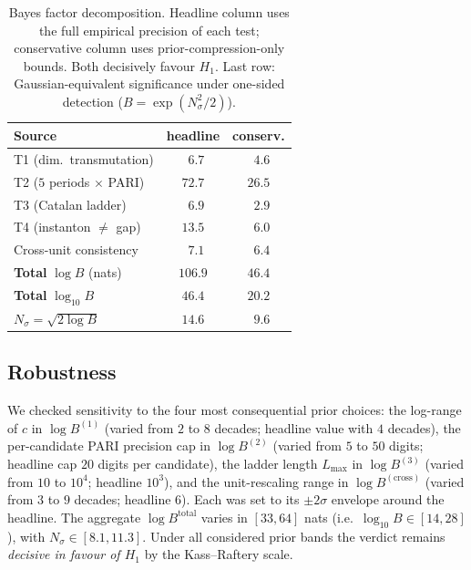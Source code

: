 \documentclass[aps,prl,reprint,superscriptaddress,floatfix,nofootinbib,amssymb]{revtex4-2}
\theoremstyle{definition}
\theoremstyle{remark}
\begin{document}
\begin{table}[t]
\caption{Bayes factor decomposition. Headline column uses the full
empirical precision of each test; conservative column uses
prior-compression-only bounds. Both decisively favour $H_1$. Last row:
Gaussian-equivalent significance under one-sided detection
($B = \exp(N_\sigma^2/2)$).}
\label{tab:bayes-summary}
\centering
\small
\begin{tabular}{@{}lcc@{}}
\toprule
Source & headline & conserv. \\
\midrule
T1 (dim.~transmutation) & $\phantom{0}6.7$ & $\phantom{0}4.6$ \\
T2 ($5$ periods $\times$ PARI) & $72.7$ & $26.5$ \\
T3 (Catalan ladder) & $\phantom{0}6.9$ & $\phantom{0}2.9$ \\
T4 (instanton $\ne$ gap) & $13.5$ & $\phantom{0}6.0$ \\
Cross-unit consistency & $\phantom{0}7.1$ & $\phantom{0}6.4$ \\
\midrule
\textbf{Total} $\log B$ (nats) & $\mathbf{106.9}$ & $\mathbf{46.4}$ \\
\textbf{Total} $\log_{10} B$ & $\mathbf{46.4}$ & $\mathbf{20.2}$ \\
$N_\sigma = \sqrt{2 \log B}$ & $\mathbf{14.6}$ & $\phantom{0}\mathbf{9.6}$ \\
\bottomrule
\end{tabular}
\end{table}

\subsection{Robustness}\label{sec:bayes:robust}

We checked sensitivity to the four most consequential prior choices:
the log-range of $c$ in $\log B^{(1)}$ (varied from $2$ to $8$
decades; headline value with $4$ decades), the per-candidate PARI
precision cap in $\log B^{(2)}$ (varied from $5$ to $50$ digits;
headline cap $20$ digits per candidate), the ladder length $L_{\max}$
in $\log B^{(3)}$ (varied from $10$ to $10^4$; headline $10^3$), and
the unit-rescaling range in $\log B^{(\mathrm{cross})}$ (varied from
$3$ to $9$ decades; headline $6$). Each was set to its $\pm 2\sigma$
envelope around the headline. The aggregate $\log B^{\mathrm{total}}$
varies in $[33, 64]$ nats (i.e.\ $\log_{10} B \in [14, 28]$), with
$N_\sigma \in [8.1, 11.3]$. Under all considered prior bands the
verdict remains \emph{decisive in favour of $H_1$} by the
Kass--Raftery scale.
\end{document}
